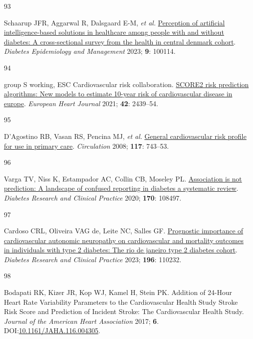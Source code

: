 \documentclass[
  a4paper,
  headsepline=true,
  open=any]{scrbook}
\newlength{\cslhangindent}
\newlength{\csllabelwidth}
\newlength{\cslentryspacingunit} %
\newenvironment{CSLReferences}[2] %
 {%
  \setlength{\parindent}{0pt}
  \ifodd #1
  \let\oldpar\par
  \def\par{\hangindent=\cslhangindent\oldpar}
  \fi
  \setlength{\parskip}{#2\cslentryspacingunit}
 }%
 {}
\newcommand{\CSLLeftMargin}[1]{\parbox[t]{\csllabelwidth}{#1}}
\newcommand{\CSLRightInline}[1]{\parbox[t]{\linewidth - \csllabelwidth}{#1}\break}
\begin{document}
\begin{CSLReferences}{0}{0}
\leavevmode{}%
\CSLLeftMargin{93 }%
\CSLRightInline{Schaarup JFR, Aggarwal R, Dalsgaard E-M, \emph{et al.}
\href{https://doi.org/10.1016/j.deman.2022.100114}{Perception of
artificial intelligence-based solutions in healthcare among people with
and without diabetes: A cross-sectional survey from the health in
central denmark cohort}. \emph{Diabetes Epidemiology and Management}
2023; \textbf{9}: 100114.}

\leavevmode{}%
\CSLLeftMargin{94 }%
\CSLRightInline{group S working, ESC Cardiovascular risk collaboration.
\href{https://doi.org/10.1093/eurheartj/ehab309}{SCORE2 risk prediction
algorithms: New models to estimate 10-year risk of cardiovascular
disease in europe}. \emph{European Heart Journal} 2021; \textbf{42}:
2439--54.}

\leavevmode{}%
\CSLLeftMargin{95 }%
\CSLRightInline{D'Agostino RB, Vasan RS, Pencina MJ, \emph{et al.}
\href{https://doi.org/10.1161/CIRCULATIONAHA.107.699579}{General
cardiovascular risk profile for use in primary care}. \emph{Circulation}
2008; \textbf{117}: 743--53.}

\leavevmode{}%
\CSLLeftMargin{96 }%
\CSLRightInline{Varga TV, Niss K, Estampador AC, Collin CB, Moseley PL.
\href{https://doi.org/10.1016/j.diabres.2020.108497}{Association is not
prediction: A landscape of confused reporting in diabetes {\textendash}
a systematic review}. \emph{Diabetes Research and Clinical Practice}
2020; \textbf{170}: 108497.}

\leavevmode{}%
\CSLLeftMargin{97 }%
\CSLRightInline{Cardoso CRL, Oliveira VAG de, Leite NC, Salles GF.
\href{https://doi.org/10.1016/j.diabres.2022.110232}{Prognostic
importance of cardiovascular autonomic neuropathy on cardiovascular and
mortality outcomes in individuals with type 2 diabetes: The rio de
janeiro type 2 diabetes cohort}. \emph{Diabetes Research and Clinical
Practice} 2023; \textbf{196}: 110232.}

\leavevmode{}%
\CSLLeftMargin{98 }%
\CSLRightInline{Bodapati RK, Kizer JR, Kop WJ, Kamel H, Stein PK.
Addition of 24-Hour Heart Rate Variability Parameters to the
Cardiovascular Health Study Stroke Risk Score and Prediction of Incident
Stroke: The Cardiovascular Health Study. \emph{Journal of the American
Heart Association} 2017; \textbf{6}.
DOI:\href{https://doi.org/10.1161/JAHA.116.004305}{10.1161/JAHA.116.004305}.}


\end{CSLReferences}
\end{document}
